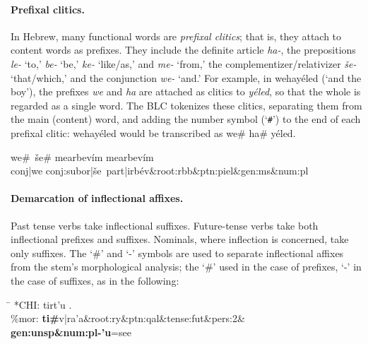 \paragraph{Prefixal clitics.} In Hebrew, many functional words are \textit{prefixal clitics}; that is, they attach to content 
words as prefixes. They include the definite article \textit{ha-}, the prepositions \textit{le-} `to,' \textit{be-} `be,' 
\textit{ke-} `like/as,' and \textit{me-} `from,' the  complementizer/relativizer \textit{\v{s}e-} `that/which,' and the 
conjunction \textit{we-} `and.' For example,  in
\textsf{wehay\'eled} (`and the boy'), the prefixes \textit{we} and \textit{ha} are attached as clitics to \textit{y\'eled}, 
so that the whole is regarded as a single word. The BLC tokenizes these clitics, separating them from the main (content) 
word, and adding the number symbol (`\texttt{\#}') to the end of each prefixal clitic: \textsf{wehay\'eled} 
would be transcribed as \textsf{we\# ha\# y\'eled}.

\begin{exe}\label{ex:preclitics}
	\ex
	\textsf{we\#\, \v{s}e\# mearbev\'im} \textsf{mearbev\'im}\\
	\textsf{conj|we conj:subor|\v{s}e\, part|irb\'ev\&root:rbb\&ptn:piel\&gen:ms\&num:pl} 
\end{exe}


\paragraph{Demarcation of inflectional affixes.}
Past tense verbs take inflectional suffixes. Future-tense verbs take both inflectional prefixes and suffixes. 
Nominals, where inflection
is concerned, take only suffixes. The `\#' and `-' symbols are used to separate inflectional
affixes from the stem's morphological analysis; the `\#' used in the case of prefixes, `-' in the
case of suffixes, as in the following:

\begin{exe}
\ex \begin{tabbing} \label{ex:pre:v:suf}
\hspace{0.6in} \= \hspace{5.5in} \kill
\textsf{*CHI:} \> \textsf{tirt\a'{u} .} \\
\textsf{\%mor:} \> \textbf{\textsf{ti}\#}\textsf{v|ra\a'{a}\&root:ry\&ptn:qal\&tense:fut\&pers:2\&
\textbf{gen:unsp\&num:pl-\a'{u}}=see}
\end{tabbing}
\end{exe}

